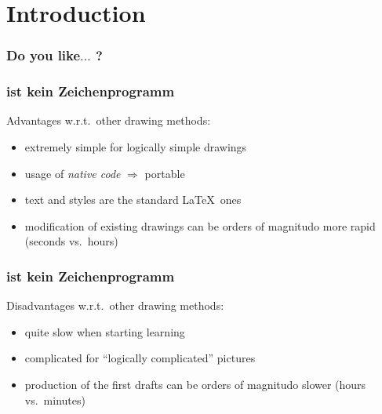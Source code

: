 \section{Introduction}




\begin{frame}
	\frametitle{Do you like$\ldots$ ?}
	
\end{frame}








\begin{frame}
	\frametitle{\Tikz ist kein Zeichenprogramm}
	\begin{center}
	\end{center}
	{
		\alert{Advantages w.r.t.\ other drawing methods:}
		\begin{itemize}
			\item extremely simple for logically simple drawings
			\item usage of \emph{native code} $\Rightarrow$ portable
			\item text and styles are the standard \LaTeX\ ones
			\item modification of existing drawings can be \alert{orders of magnitudo} more rapid (seconds vs.\ hours)
		\end{itemize}
	}
\end{frame}





\begin{frame}
	\frametitle{\Tikz ist kein Zeichenprogramm}
	\begin{center}
	\end{center}
	{
		\alert{Disadvantages w.r.t.\ other drawing methods:}
		\begin{itemize}
			\item quite slow when starting learning
			\item complicated for ``logically complicated'' pictures
			\item production of the first drafts can be \alert{orders of magnitudo} slower (hours vs.\ minutes)
		\end{itemize}
	}
\end{frame}





